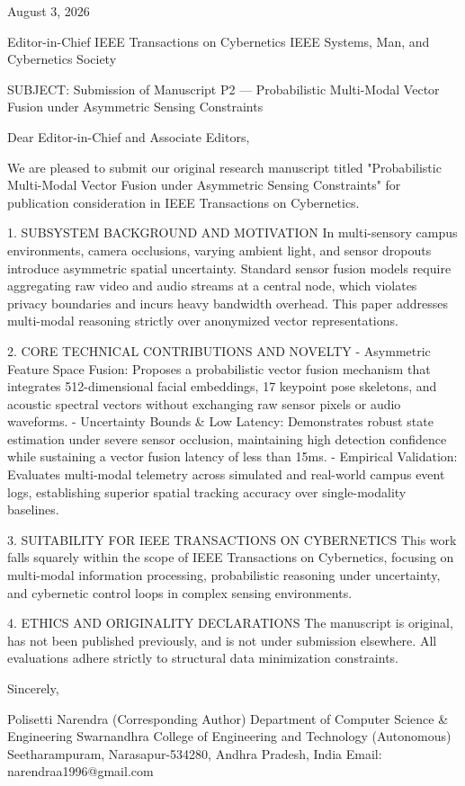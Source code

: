 August 3, 2026

Editor-in-Chief
IEEE Transactions on Cybernetics
IEEE Systems, Man, and Cybernetics Society

SUBJECT: Submission of Manuscript P2 — Probabilistic Multi-Modal Vector Fusion under Asymmetric Sensing Constraints

Dear Editor-in-Chief and Associate Editors,

We are pleased to submit our original research manuscript titled "Probabilistic Multi-Modal Vector Fusion under Asymmetric Sensing Constraints" for publication consideration in IEEE Transactions on Cybernetics.

1. SUBSYSTEM BACKGROUND AND MOTIVATION
In multi-sensory campus environments, camera occlusions, varying ambient light, and sensor dropouts introduce asymmetric spatial uncertainty. Standard sensor fusion models require aggregating raw video and audio streams at a central node, which violates privacy boundaries and incurs heavy bandwidth overhead. This paper addresses multi-modal reasoning strictly over anonymized vector representations.

2. CORE TECHNICAL CONTRIBUTIONS AND NOVELTY
  - Asymmetric Feature Space Fusion: Proposes a probabilistic vector fusion mechanism that integrates 512-dimensional facial embeddings, 17 keypoint pose skeletons, and acoustic spectral vectors without exchanging raw sensor pixels or audio waveforms.
  - Uncertainty Bounds & Low Latency: Demonstrates robust state estimation under severe sensor occlusion, maintaining high detection confidence while sustaining a vector fusion latency of less than 15ms.
  - Empirical Validation: Evaluates multi-modal telemetry across simulated and real-world campus event logs, establishing superior spatial tracking accuracy over single-modality baselines.

3. SUITABILITY FOR IEEE TRANSACTIONS ON CYBERNETICS
This work falls squarely within the scope of IEEE Transactions on Cybernetics, focusing on multi-modal information processing, probabilistic reasoning under uncertainty, and cybernetic control loops in complex sensing environments.

4. ETHICS AND ORIGINALITY DECLARATIONS
The manuscript is original, has not been published previously, and is not under submission elsewhere. All evaluations adhere strictly to structural data minimization constraints.

Sincerely,

Polisetti Narendra (Corresponding Author)
Department of Computer Science & Engineering
Swarnandhra College of Engineering and Technology (Autonomous)
Seetharampuram, Narasapur-534280, Andhra Pradesh, India
Email: narendraa1996@gmail.com
